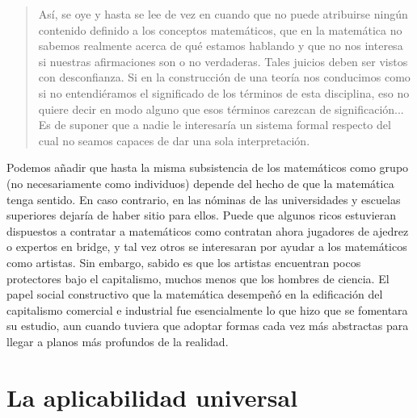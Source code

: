 \documentclass[a4paper, 12pt]{article}
\begin{document}
{{\begin{quote}\small Así, se oye y hasta se lee de vez en cuando que no puede
atribuirse ningún contenido definido a los conceptos matemáticos, que en la
matemática no sabemos realmente acerca de qué estamos hablando y que no nos
interesa si nuestras afirmaciones son o no verdaderas. Tales juicios deben ser
vistos con desconfianza. Si en la construcción de una teoría nos conducimos como
si no entendiéramos el significado de los términos de esta disciplina, eso no
quiere decir en modo alguno que esos términos carezcan de significación... Es de
suponer que a nadie le interesaría un sistema formal respecto del cual no seamos
capaces de dar una sola interpretación. \end{quote}

Podemos añadir que hasta la misma subsistencia de los matemáticos como grupo (no
necesariamente como individuos) depende del hecho de que la matemática tenga
sentido. En caso contrario, en las nóminas de las universidades y escuelas
superiores dejaría de haber sitio para ellos. Puede que algunos ricos estuvieran
dispuestos a contratar a matemáticos como contratan ahora jugadores de ajedrez o
expertos en bridge, y tal vez otros se interesaran por ayudar a los matemáticos
como artistas. Sin embargo, sabido es que los artistas encuentran pocos
protectores bajo el capitalismo, muchos menos que los hombres de ciencia. El
papel social constructivo que la matemática desempeñó en la edificación del
capitalismo comercial e industrial fue esencialmente lo que hizo que se
fomentara su estudio, aun cuando tuviera que adoptar formas cada vez más
abstractas para llegar a planos más profundos de la realidad.

\section*{La aplicabilidad universal}

}}
\end{document}
